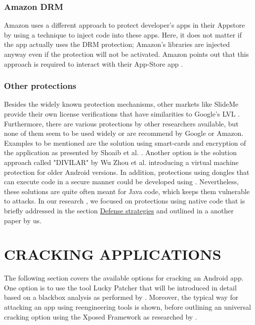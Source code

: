 \documentclass{sig-alternate}
\begin{document}
\subsubsection{Amazon DRM}

Amazon uses a different approach to protect developer's apps in their Appstore by using a technique to inject code into these apps. Here, it does not matter if the app actually uses the DRM protection; Amazon's libraries are injected anyway even if the protection will not be activated. Amazon points out that this approach is required to interact with their App-Store app \cite{AT3}. \\

\subsubsection{Other protections}

Besides the widely known protection mechanisms, other markets like SlideMe provide their own license verifications that have similarities to Google's LVL \cite{AT7}. Furthermore, there are various protections by other researchers available, but none of them seem to be used widely or are recommend by Google or Amazon. Examples to be mentioned are the solution using smart-cards and encryption of the application as presented by Shoaib et al. \cite{RW1}. Another option is the solution approach called "DIVILAR" by Wu Zhou et al. \cite{RW3} introducing a virtual machine protection for older Android versions. In addition, protections using dongles that can execute code in a secure manner could be developed using \cite{RW2}. Nevertheless, these solutions are quite often meant for Java code, which keeps them vulnerable to attacks. In our research \cite{nils}, we focused on protections using native code that is briefly addressed in the section \hyperref[defense]{Defense strategies} and outlined in a another paper by us.

\section{CRACKING APPLICATIONS}
The following section covers the available options for cracking an Android app. One option is to use the tool Lucky Patcher that will be introduced in detail based on a blackbox analysis as performed by \cite{neutze}. Moreover, the typical way for attacking an app using reengineering tools is shown, before outlining an universal cracking option using the Xposed Framework as researched by \cite{xAT4}.
\end{document}
